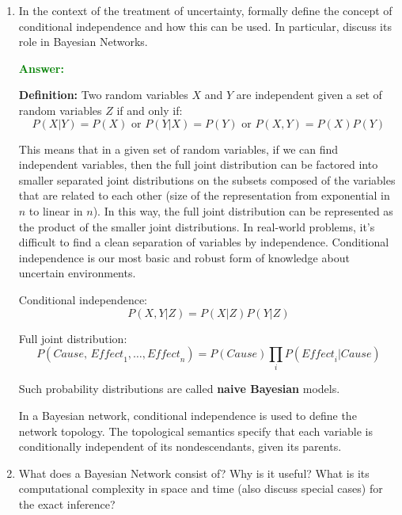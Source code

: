 \documentclass[12pt]{article}
\begin{document}
\begin{enumerate}[label=\textbf{U.\arabic*}]
    \item\label{q:cond_ind} In the context of the treatment of uncertainty, formally define the concept of conditional independence and how this can be used. In particular, discuss its role in Bayesian Networks.

          \textcolor{green}{\textbf{Answer:}}

          \textbf{Definition:} Two random variables $X$ and $Y$ are independent given a set of random variables $Z$ if and only if:
          \begin{equation}\label{eq:prob_ind}
              P(X|Y) = P(X) \text{ or } P(Y|X) = P(Y) \text{ or } P(X,Y) = P(X)P(Y)
          \end{equation}

          This means that in a given set of random variables, if we can find independent variables, then the full joint distribution can be factored into smaller separated joint distributions on the subsets composed of the variables that are related to each other (size of the representation from exponential in $n$ to linear in $n$). In this way, the full joint distribution can be represented as the product of the smaller joint distributions. In real-world problems, it's difficult to find a clean separation of variables by independence. Conditional independence is our most basic and robust form of knowledge about uncertain environments.

          Conditional independence:
          \begin{equation}\label{eq:prob_cond_ind}
              P(X,Y|Z) = P(X|Z)P(Y|Z)
          \end{equation}

          Full joint distribution:
          \begin{equation}
              P(\textit{Cause, Effect}_1, \ldots, \textit{Effect}_n) = P(Cause) \prod_{i} P(\textit{Effect}_i | Cause)
          \end{equation}

          Such probability distributions are called \textbf{naive Bayesian} models.

          In a Bayesian network, conditional independence is used to define the network topology. The topological semantics specify that each variable is conditionally independent of its nondescendants, given its parents.


    \item\label{q:Bayesian-Net} What does a Bayesian Network consist of?
          Why is it useful?
          What is its computational complexity in space and time (also discuss special cases) for the exact inference?


\end{enumerate}
\end{document}
